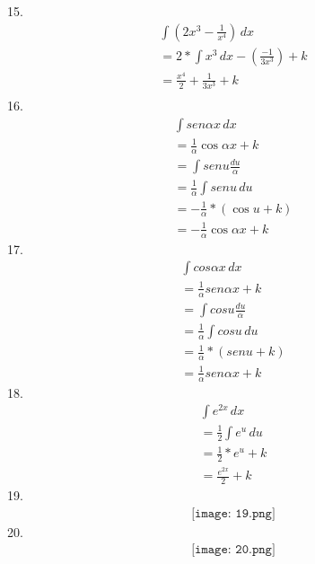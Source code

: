 \documentclass{article}
\begin{document}
15.
\begin{gather*}
    \int (2x^3 - \frac{1}{x^4}) \,dx
\\
    = 2 * \int x^3 \,dx - (\frac{-1}{3x^3}) + k
\\
    = \frac{x^4}{2} + \frac{1}{3x^3} + k
\\
\end{gather*}
16.
\begin{gather*}
    \int sen \alpha x \,dx
\\
    = \frac{1}{\alpha} \cos \alpha x + k
\\
    = \int sen u \frac{du}{\alpha} \
\\
    = \frac{1}{\alpha} \int sen u \,du
\\
    = -\frac{1}{\alpha} * (\cos u + k)
\\
    = -\frac{1}{\alpha} \cos \alpha x + k
\end{gather*}
17.
\begin{gather*}
    \int cos \alpha x \,dx
\\
    = \frac{1}{\alpha} sen \alpha x + k
\\
    = \int cos u \frac{du}{\alpha} \
\\
    = \frac{1}{\alpha} \int cos u \,du
\\
    = \frac{1}{\alpha} * (sen u + k)
\\
    = \frac{1}{\alpha} sen \alpha x + k
\end{gather*}
18.
\begin{gather*}
    \int e^{2x} \,dx
\\
    = \frac{1}{2} \int e^u \,du
\\
    = \frac{1}{2} * e^u + k
\\
    = \frac{e^{2x}}{2} + k
\end{gather*}
19.
\begin{gather*}
    \texttt{[image: 19.png]}
\end{gather*}
20.
\begin{gather*}
    \texttt{[image: 20.png]}
\end{gather*}
\end{document}
